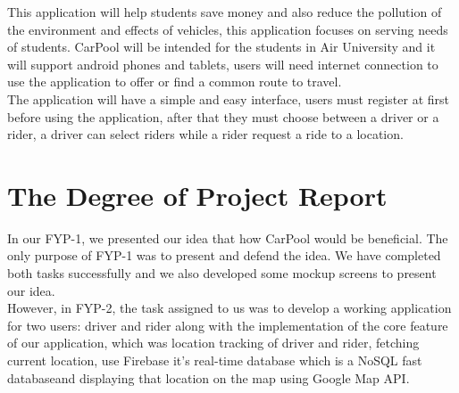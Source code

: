 This application will help students save money and also reduce the pollution of the environment and eﬀects of vehicles, this application focuses on serving needs of students. CarPool will be intended for the students in Air University and it will support android phones and tablets, users will need internet connection to use the application to oﬀer or ﬁnd a common route to travel.\\

The application will have a simple and easy interface, users must register at ﬁrst before using the application, after that they must choose between a driver or a
rider, a driver can select riders while a rider request a ride to a location.

\section{The Degree of Project Report}
In our FYP-1, we presented our idea that how CarPool would be beneficial. The only purpose of FYP-1 was to present and defend the idea. We have completed both tasks successfully and we also developed some mockup screens to present our idea.\\

However, in FYP-2, the task assigned to us was to develop a working application for two users: driver and rider along with the implementation of the core feature of our application, which was location tracking of driver and rider, fetching current location, use Firebase it’s real-time database which is a NoSQL fast databaseand displaying that location on the map using Google Map API.
